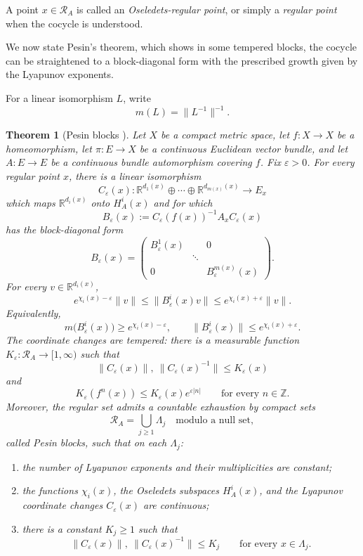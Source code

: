\documentclass[11pt]{amsart}
\numberwithin{equation}{section}
\theoremstyle{plain}
\newtheorem{thm}{Theorem}[section]
\begin{document}
A point $x\in\mathcal R_A$ is called an
\emph{Oseledets-regular point}, or simply a \emph{regular point} when
the cocycle is understood.

 
We now state Pesin's theorem, which shows in some tempered blocks, the cocycle can be straightened to a block-diagonal form with the prescribed growth given by the Lyapunov exponents.

For a linear isomorphism $L$, write \[ m(L)=\|L^{-1}\|^{-1}. \] 

\begin{thm}[Pesin blocks {\cite[Theorem~4.13]{introdyn}}]\label{thm:pesin-blocks} Let $X$ be a compact metric space, let $f:X\to X$ be a homeomorphism, let $\pi:E\to X$ be a continuous Euclidean vector bundle, and let $A:E\to E$ be a continuous bundle automorphism covering $f$. Fix $\varepsilon>0$. For every regular point $x$, there is a linear isomorphism \[ C_\varepsilon(x): \mathbb R^{d_1(x)}\oplus\cdots\oplus \mathbb R^{d_{m(x)}(x)} \longrightarrow E_x \] which maps $\mathbb R^{d_i(x)}$ onto $H_A^i(x)$ and for which \[ B_\varepsilon(x) := C_\varepsilon(f(x))^{-1}A_xC_\varepsilon(x) \] has the block-diagonal form \[ B_\varepsilon(x) = \begin{pmatrix} B_\varepsilon^1(x) & & 0\\ &\ddots&\\ 0&&B_\varepsilon^{m(x)}(x) \end{pmatrix}. \] For every $v\in\mathbb R^{d_i(x)}$, \[ e^{\chi_i(x)-\varepsilon}\|v\| \le \|B_\varepsilon^i(x)v\| \le e^{\chi_i(x)+\varepsilon}\|v\|. \] Equivalently, \[ m\bigl(B_\varepsilon^i(x)\bigr) \ge e^{\chi_i(x)-\varepsilon}, \qquad \bigl\|B_\varepsilon^i(x)\bigr\| \le e^{\chi_i(x)+\varepsilon}. \] The coordinate changes are tempered: there is a measurable function $K_\varepsilon:\mathcal R_A\to[1,\infty)$ such that \[ \|C_\varepsilon(x)\|, \ \|C_\varepsilon(x)^{-1}\| \le K_\varepsilon(x) \] and \[ K_\varepsilon(f^n(x)) \le K_\varepsilon(x)e^{\varepsilon|n|} \qquad \text{for every }n\in\mathbb Z. \] Moreover, the regular set admits a countable exhaustion by compact sets \[ \mathcal R_A = \bigcup_{j\ge1}\Lambda_j \quad\text{modulo a null set}, \] called \emph{Pesin blocks}, such that on each $\Lambda_j$: \begin{enumerate} \item the number of Lyapunov exponents and their multiplicities are constant; \item the functions $\chi_i(x)$, the Oseledets subspaces $H_A^i(x)$, and the Lyapunov coordinate changes $C_\varepsilon(x)$ are continuous; \item there is a constant $K_j\ge1$ such that \[ \|C_\varepsilon(x)\|, \ \|C_\varepsilon(x)^{-1}\| \le K_j \qquad\text{for every }x\in\Lambda_j. \] \end{enumerate} 
\end{thm} 
\end{document}
